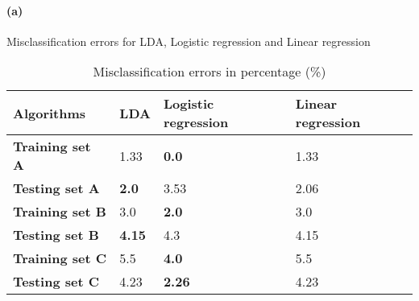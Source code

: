 \documentclass[11pt]{article}
\numberwithin{figure}{section} %
\begin{document}
\paragraph{(a)} Misclassification errors for LDA, Logistic regression and Linear regression
\begin{table}[H]
\centering
\begin{tabular}{@{}llll@{}}
\toprule
\rowcolor[HTML]{EFEFEF} 
{\color[HTML]{000000} \textbf{Algorithms}} & {\color[HTML]{000000} \textbf{LDA}} & {\color[HTML]{000000} \textbf{Logistic regression}} & {\color[HTML]{000000} \textbf{Linear regression}} \\ \midrule
\rowcolor[HTML]{FFFFFF} 
\textbf{Training set A} & 1.33 & \textbf{0.0} & 1.33 \\
\rowcolor[HTML]{FFFFFF} 
\textbf{Testing set A} & \textbf{2.0} & 3.53 & 2.06 \\ \midrule
\rowcolor[HTML]{FFFFFF} 
{\color[HTML]{333333} \textbf{Training set B}} & {\color[HTML]{333333} 3.0} & {\color[HTML]{333333} \textbf{2.0}} & {\color[HTML]{333333} 3.0} \\
\rowcolor[HTML]{FFFFFF} 
{\color[HTML]{333333} \textbf{Testing set B}} & {\color[HTML]{333333} \textbf{4.15}} & {\color[HTML]{333333} 4.3} & {\color[HTML]{333333} 4.15} \\ \midrule
\rowcolor[HTML]{FFFFFF} 
\textbf{Training set C} & 5.5 & \textbf{4.0} & 5.5 \\
\rowcolor[HTML]{FFFFFF} 
\textbf{Testing set C} & 4.23 & \textbf{2.26} & 4.23 \\ \bottomrule
\end{tabular}
\caption{Misclassification errors in percentage (\%)}
\label{Models Performance}
\end{table}
\end{document}
